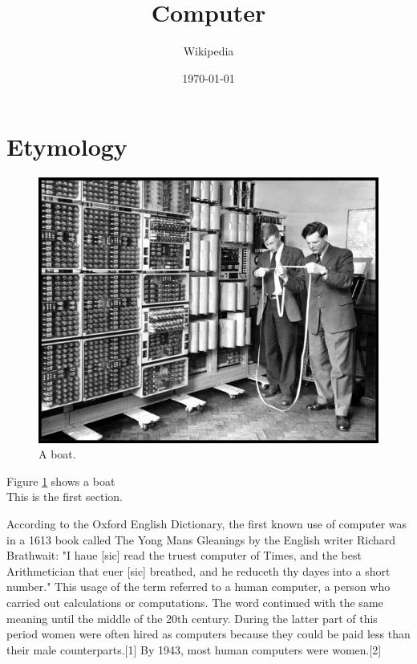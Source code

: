 \documentclass{article}
\title{Computer}
\author{Wikipedia}
\date{\today}
\begin{document}
\maketitle
\newpage
\tableofcontents

\section{Etymology}
\begin{figure}

\includegraphics[width=\linewidth]{comp.jpg}

\caption{A boat.}

\label{fig:boatI}

\end{figure}

Figure \ref{fig:boatI} shows a boat\\

This is the first section.

According to the Oxford English Dictionary, the first known use of computer was in a 1613 book called The Yong Mans Gleanings by the English writer Richard Brathwait: "I haue [sic] read the truest computer of Times, and the best Arithmetician that euer [sic] breathed, and he reduceth thy dayes into a short number." This usage of the term referred to a human computer, a person who carried out calculations or computations. The word continued with the same meaning until the middle of the 20th century. During the latter part of this period women were often hired as computers because they could be paid less than their male counterparts.[1] By 1943, most human computers were women.[2]
\end{document}
